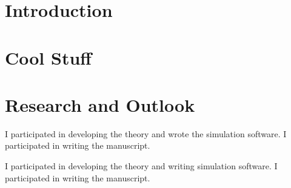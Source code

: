 \documentclass[11pt]{book}
\begin{document}
\mainmatter
\setcounter{table}{0} 
\setcounter{page}{1}

\chap{\myTitle}
\newpage

\chapter{Introduction}

\chapter{Cool Stuff}

\chapter{Research and Outlook}


\renewcommand{\bibname}{References}





I participated in developing the theory and wrote the simulation software. I participated in writing the manuscript.


I participated in developing the theory and writing simulation software. I participated in writing the manuscript.


\end{document}
